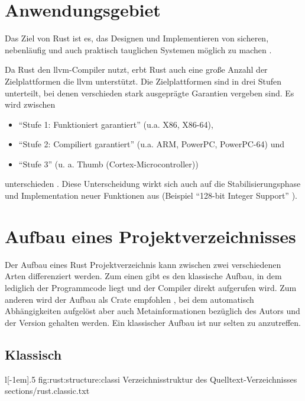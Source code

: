 \section{Anwendungsgebiet}

Das Ziel von Rust ist es, das Designen und Implementieren von sicheren, nebenläufig und auch praktisch tauglichen Systemen möglich zu machen \cite{rust:faq}.

Da Rust den \gls{llvm}-Compiler nutzt, erbt Rust auch eine große Anzahl der Zielplattformen die \gls{llvm} unterstützt.
Die Zielplattformen sind in drei Stufen unterteilt, bei denen verschieden stark ausgeprägte Garantien vergeben sind. Es wird zwischen
\begin{itemize}
	\item \enquote{Stufe 1: Funktioniert garantiert} (u.a. X86, X86-64),
	\item \enquote{Stufe 2: Compiliert garantiert} (u.a. ARM, PowerPC, PowerPC-64) und
	\item \enquote{Stufe 3} (u. a. Thumb (Cortex-Microcontroller))
\end{itemize}
unterschieden \cite{rust:platform_support}.
Diese Unterscheidung wirkt sich auch auf die Stabilisierungsphase und Implementation neuer Funktionen aus (Beispiel \enquote{128-bit Integer Support} \cite{rust:github:128bit_integer}).

\section{Aufbau eines Projektverzeichnisses}

Der Aufbau eines Rust Projektverzeichnis kann zwischen zwei verschiedenen Arten differenziert werden.
Zum einen gibt es den klassische Aufbau, in dem lediglich der Programmcode liegt und der Compiler direkt aufgerufen wird.
Zum anderen wird der Aufbau als Crate empfohlen , bei dem automatisch Abhängigkeiten aufgelöst aber auch Metainformationen bezüglich des Autors und der Version gehalten werden.
Ein klassischer Aufbau ist nur selten zu anzutreffen.

\subsection{Klassisch}
\label{rust:structure:classic}
\begin{wrapfigure}{l}[-1em]{.5\textwidth}
	\rustcinclude
		{fig:rust:structure:classi}
		{Verzeichnisstruktur des Quelltext-Verzeichnisses}
		{sections/rust.classic.txt}
\end{wrapfigure}

